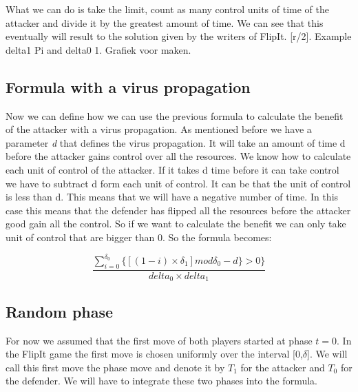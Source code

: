 What we can do is take the limit, count as many control units of time of the attacker and divide it by the greatest amount of time. We can see that this eventually will result to the solution given by the writers of FlipIt. [r/2]. Example delta1 Pi and delta0 1. Grafiek voor maken.


\subsection{Formula with a virus propagation}
Now we can define how we can use the previous formula to calculate the benefit of the attacker with a virus propagation.
As mentioned before we have a parameter \textit{d} that defines the virus propagation. It will take an amount of time d before the attacker gains control over all the resources. We know how to calculate each unit of control of the attacker. If it takes d time before it can take control we have to subtract d form each unit of control. It can be that the unit of control is less than d. This means that we will have a negative number of time. In this case this means that the defender has flipped all the resources before the attacker good gain all the control. So if we want to calculate the benefit we can only take unit of control that are bigger than 0. So the formula becomes:

\begin{equation}\label{first}
\dfrac{\sum_{i=0}^{\delta_{0}} \lbrace [( 1 - i ) \times \delta_{1}] mod \delta_{0} - d \rbrace  > 0 \rbrace }{delta_{0} \times delta_{1}} 
\end{equation}

\subsection{Random phase}
For now we assumed that the first move of both players started at phase $t=0$. In the FlipIt game the first move is chosen uniformly over the interval [0,$\delta$]. We will call this first move the phase move and denote it by $T_{1}$ for the attacker and $T_{0}$ for the defender.
We will have to integrate these two phases into the formula.  
%
%





